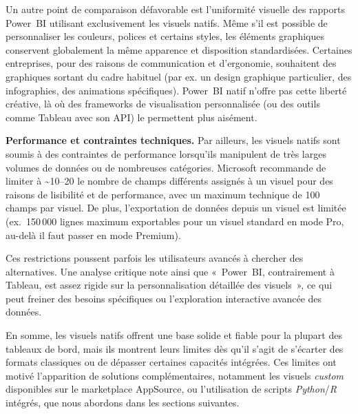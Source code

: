 Un autre point de comparaison défavorable est l’uniformité visuelle des rapports Power~BI utilisant exclusivement les visuels natifs.  
Même s’il est possible de personnaliser les couleurs, polices et certains styles, les éléments graphiques conservent globalement la même apparence et disposition standardisées.  
Certaines entreprises, pour des raisons de communication et d’ergonomie, souhaitent des graphiques sortant du cadre habituel (par ex. un design graphique particulier, des infographies, des animations spécifiques).  
Power~BI natif n’offre pas cette liberté créative, là où des frameworks de visualisation personnalisée (ou des outils comme Tableau avec son API) le permettent plus aisément\parencite{FyndAcademyPBIvsTableau2024}.

\textbf{Performance et contraintes techniques.}  
Par ailleurs, les visuels natifs sont soumis à des contraintes de performance lorsqu’ils manipulent de très larges volumes de données ou de nombreuses catégories.  
Microsoft recommande de limiter à \textasciitilde10–20 le nombre de champs différents assignés à un visuel pour des raisons de lisibilité et de performance, avec un maximum technique de 100 champs par visuel\parencite{MicrosoftVisualLimits2024}.  
De plus, l’exportation de données depuis un visuel est limitée (ex.~150\,000 lignes maximum exportables pour un visuel standard en mode Pro, au-delà il faut passer en mode Premium)\parencite{PowerBICommunityExportLimit2023}.

Ces restrictions poussent parfois les utilisateurs avancés à chercher des alternatives.  
Une analyse critique note ainsi que «~Power~BI, contrairement à Tableau, est assez rigide sur la personnalisation détaillée des visuels~», ce qui peut freiner des besoins spécifiques ou l’exploration interactive avancée des données\parencite{FyndAcademyPBIvsTableau2024}.

En somme, les visuels natifs offrent une base solide et fiable pour la plupart des tableaux de bord, mais ils montrent leurs limites dès qu’il s’agit de s’écarter des formats classiques ou de dépasser certaines capacités intégrées.  
Ces limites ont motivé l’apparition de solutions complémentaires, notamment les visuels \textit{custom} disponibles sur le marketplace AppSource, ou l’utilisation de scripts \textit{Python}/\textit{R} intégrés, que nous abordons dans les sections suivantes.
